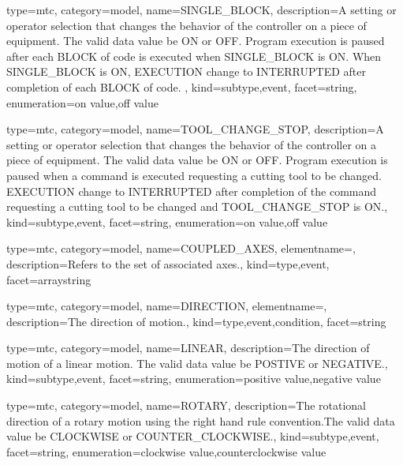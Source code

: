 {
  type=mtc,
  category=model,
  name={SINGLE\_BLOCK},
  description={A setting or operator selection that changes the behavior of the controller on a piece of equipment.  The \gls{valid data value} \must be ON or OFF. Program execution is paused after each BLOCK of code is executed when SINGLE\_BLOCK is ON.   \newline When SINGLE\_BLOCK is ON, EXECUTION \must change to INTERRUPTED after completion of each BLOCK of code. },
  kind={subtype,event},
  facet={\gls{string}},
  enumeration={\gls{on value},\gls{off value}}
}


{
  type=mtc,
  category=model,
  name={TOOL\_CHANGE\_STOP},
  description={A setting or operator selection that changes the behavior of the controller on a piece of equipment.  The \gls{valid data value} \must be ON or OFF. Program execution is paused when a command is executed requesting a cutting tool to be changed. EXECUTION \must change to INTERRUPTED after completion of the command requesting a cutting tool to be changed and TOOL\_CHANGE\_STOP is ON.},
  kind={subtype,event},
  facet={\gls{string}},
  enumeration={\gls{on value},\gls{off value}}
}


{
  type=mtc,
  category=model,
  name={COUPLED\_AXES},
  elementname=,
  description={Refers to the set of associated axes.},
  kind={type,event},
  facet={\gls{arraystring}}
}


{
  type=mtc,
  category=model,
  name={DIRECTION},
  elementname=,
  description={The direction of motion.},
  kind={type,event,condition},
  facet={\gls{string}}
}


{
  type=mtc,
  category=model,
  name={LINEAR},
  description={The direction of motion of a linear motion.   The \gls{valid data value} \must be POSTIVE or NEGATIVE.},
  kind={subtype,event},
  facet={\gls{string}},
  enumeration={\gls{positive value},\gls{negative value}}
}


{
  type=mtc,
  category=model,
  name={ROTARY},
  description={The rotational direction of a rotary motion using the right hand rule convention.The \gls{valid data value} \must be CLOCKWISE or COUNTER\_CLOCKWISE.},
  kind={subtype,event},
  facet={\gls{string}},
  enumeration={\gls{clockwise value},\gls{counterclockwise value}}
}



